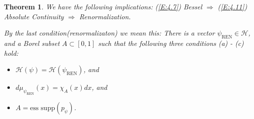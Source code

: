 \documentclass{birkmult}
\newtheorem{thm}{Theorem}[section]
\theoremstyle{definition}
\theoremstyle{remark}
\numberwithin{equation}{section}
\begin{document}
\begin{thm}
\label{T:4.3}
We have the following implications: 
(\ref{E:4.7}) Bessel $\Longrightarrow$ (\ref{E:4.11}) Absolute Continuity 
$\Longrightarrow$ \textit{Renormalization}.

By the last condition(\textit{renormalizaton}) we mean this: There is a 
vector $\psi_{\text{REN}} \in \mathcal{H}$, and a Borel subset 
$A \subset [0,1]$ such that the following three conditions (a) - (c) hold:
\begin{itemize}
  \item[(a)] $\mathcal{H}(\psi) = \mathcal{H}(\psi_{\text{REN}})$, and
  \item[(b)] $d\mu_{\psi_{\text{REN}}}(x) = \chi_{A}(x)dx$, and
  \item[(c)] $A = \text{ess supp}(p_{\psi})$.
\end{itemize}
\end{thm}
\end{document}
